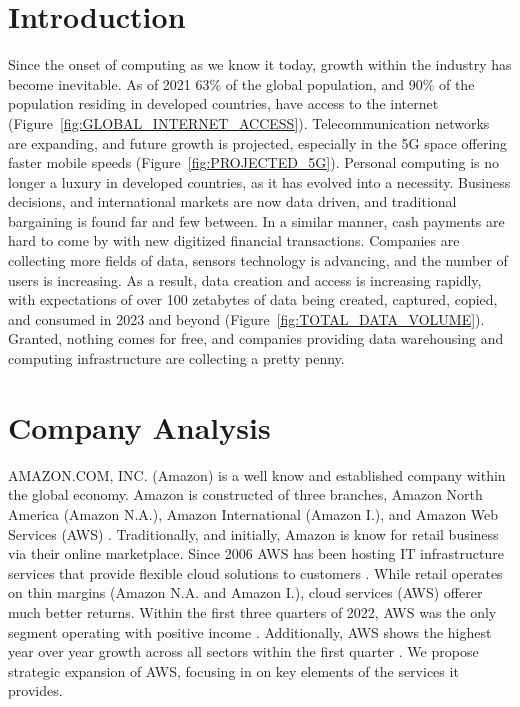 \documentclass[a4paper, 12pt]{article}
\begin{document}
\newpage

\tableofcontents
\newpage

\section{Introduction}
Since the onset of computing as we know it today, growth within the industry has become inevitable. 
As of 2021 63\% of the global population, and 90\% of the population residing in developed countries, have access to the internet (Figure~\ref{fig:GLOBAL_INTERNET_ACCESS}).
Telecommunication networks are expanding, and future growth is projected, especially in the 5G space offering faster mobile speeds (Figure~\ref{fig:PROJECTED_5G}).
Personal computing is no longer a luxury in developed countries, as it has evolved into a necessity. 
Business decisions, and international markets are now data driven, and traditional bargaining is found far and few between. 
In a similar manner, cash payments are hard to come by with new digitized financial transactions. 
Companies are collecting more fields of data, sensors technology is advancing, and the number of users is increasing. 
As a result, data creation and access is increasing rapidly, with expectations of over 100 zetabytes of data being created, captured, copied, and consumed in 2023 and beyond (Figure~\ref{fig:TOTAL_DATA_VOLUME}). 
Granted, nothing comes for free, and companies providing data warehousing and computing infrastructure are collecting a pretty penny. 

\section{Company Analysis}

AMAZON.COM, INC. (Amazon) is a well know and established company within the global economy. 
Amazon is constructed of three branches, Amazon North America (Amazon N.A.), Amazon International (Amazon I.), and Amazon Web Services (AWS) \cite[p.~22]{AMZN_10K_2021}.
Traditionally, and initially, Amazon is know for retail business via their online marketplace. 
Since 2006 AWS has been hosting IT infrastructure services that provide flexible cloud solutions to customers \cite{AMZN_ABOUT_AWS}.
While retail operates on thin margins (Amazon N.A. and Amazon I.), cloud services (AWS) offerer much better returns.
Within the first three quarters of 2022, AWS was the only segment operating with positive income \cite[p.~24, p.~19, p.~19]{AMZN_10Q_Q1_2022, AMZN_10Q_Q2_2022, AMZN_10Q_Q3_2022}. 
Additionally, AWS shows the highest year over year growth across all sectors within the first quarter \cite[p.~23, p.~24, p.~24]{AMZN_10Q_Q1_2022, AMZN_10Q_Q2_2022, AMZN_10Q_Q3_2022}. 
We propose strategic expansion of AWS, focusing in on key elements of the services it provides. 
\end{document}
